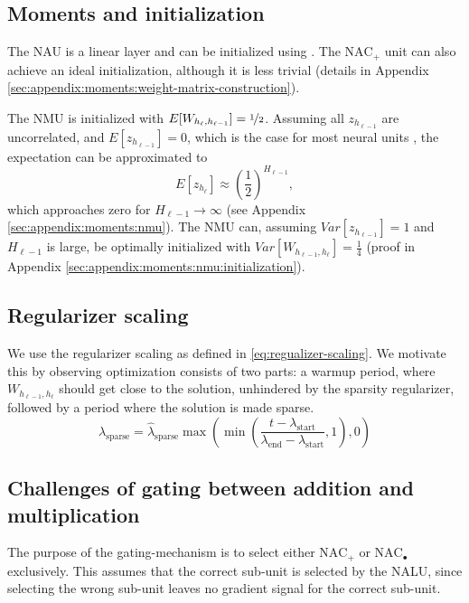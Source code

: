 \subsection{Moments and initialization}
\label{sec:methods:moments-and-initialization}
The NAU is a linear layer and can be initialized using \citet{glorot-initialization}. The $\mathrm{NAC}_{+}$ unit can also achieve an ideal initialization, although it is less trivial (details in Appendix \ref{sec:appendix:moments:weight-matrix-construction}).

The NMU is initialized with $E[W_{h_{\ell}, h_{\ell - 1}}] = \nicefrac{1}{2}$. Assuming all $z_{h_{\ell-1}}$ are uncorrelated, and $E[z_{h_{\ell-1}}] = 0$, which is the case for most neural units \cite{glorot-initialization}, the expectation can be approximated to
\begin{equation}
E[z_{h_\ell}] \approx \left(\frac{1}{2}\right)^{H_{\ell-1}},
\end{equation}
which approaches zero for $H_{\ell-1} \rightarrow \infty$ (see Appendix \ref{sec:appendix:moments:nmu}). The NMU can, assuming $Var[z_{h_{\ell-1}}] = 1$ and $H_{\ell-1}$ is large, be optimally initialized with $Var[W_{h_{\ell-1},h_\ell}] = \frac{1}{4}$ (proof in Appendix \ref{sec:appendix:moments:nmu:initialization}).

\subsection{Regularizer scaling}
We use the regularizer scaling as defined in \eqref{eq:regualizer-scaling}. We motivate this by observing optimization consists of two parts: a warmup period, where $W_{h_{\ell-1},h_\ell}$ should get close to the solution, unhindered by the sparsity regularizer, followed by a period where the solution is made sparse.
\begin{equation}
\lambda_{\mathrm{sparse}} = \hat{\lambda}_{\mathrm{sparse}} \max\left(\min\left(\frac{t - \lambda_{\mathrm{start}}}{\lambda_{\mathrm{end}} - \lambda_{\mathrm{start}}}, 1\right), 0\right)
\label{eq:regualizer-scaling}
\end{equation}

\subsection{Challenges of gating between addition and multiplication}
\label{sec:methods:gatting-issue}
The purpose of the gating-mechanism is to select either $\text{NAC}_{+}$ or $\text{NAC}_{\bullet}$ exclusively.
This assumes that the correct sub-unit is selected by the NALU, since selecting the wrong sub-unit leaves no gradient signal for the correct sub-unit.

